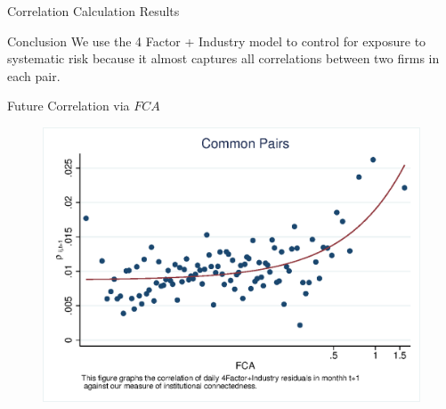 \documentclass{beamer}
\begin{document}
	\begin{frame}{Correlation Calculation Results}
		
		
%		
		
		
		\begin{table}[htbp]
			\centering 
			\scriptsize
			\resizebox{\textwidth}{!}{
				              
			}
		\end{table}
		
		
		\begin{block}{Conclusion}
			\scriptsize
			We use the 4 Factor + Industry model to control for exposure to systematic risk because it almost captures all correlations between two firms in each pair.
		\end{block}
	\end{frame}
	
	
	\begin{frame}{Future Correlation via $ FCA $}
		\begin{figure}
			\centering  
			\includegraphics[width=0.85\linewidth]{"Output/mcorr50.eps"}
		\end{figure}
	\end{frame}   
	
\end{document}
